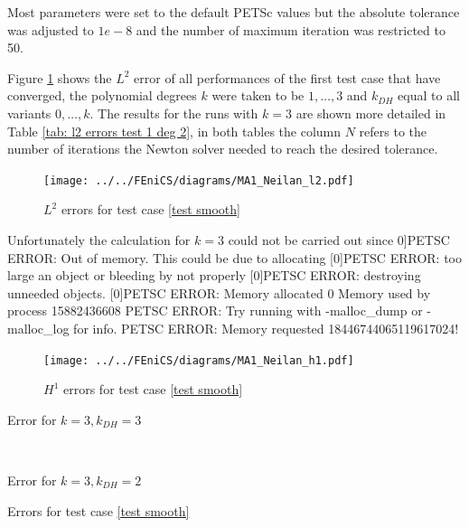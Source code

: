 Most parameters were set to the default PETSc values %
but the absolute tolerance was adjusted to $1e-8$ and the number of maximum iteration was restricted to 50. 

Figure \ref{fig: l2 errors test 1} shows the $L^2$ error of all performances of the first test case that have converged, the polynomial degrees $k$ were taken to be $1,\dots,3$ and $k_{DH}$ equal to all variants $0, \dots, k$.  The results for the runs with $k=3$ are shown more detailed in Table \ref{tab: l2 errors test 1 deg 2}, in both tables the column $N$ refers to the number of iterations the Newton solver needed to reach the desired tolerance. 



\begin{figure}[h!]
\centering
	\texttt{[image: ../../FEniCS/diagrams/MA1\_Neilan\_l2.pdf]}
	\caption{$L^2$ errors for test case \ref{test smooth}}
	\label{fig: l2 errors test 1}
\end{figure}
 Unfortunately the calculation for $k=3$ could not be carried out since 0]PETSC ERROR: Out of memory. This could be due to allocating
 [0]PETSC ERROR: too large an object or bleeding by not properly
 [0]PETSC ERROR: destroying unneeded objects.
 [0]PETSC ERROR: Memory allocated 0 Memory used by process 15882436608
 PETSC ERROR: Try running with -malloc\_dump or -malloc\_log for info.
 PETSC ERROR: Memory requested 18446744065119617024!
 
\begin{figure}[h!]
\centering
	\texttt{[image: ../../FEniCS/diagrams/MA1\_Neilan\_h1.pdf]}
	\caption{$H^1$ errors for test case \ref{test smooth}}
	\label{fig: h2 errors test 1}
\end{figure}

\begin{table}[h]
	\begin{subtable}[b]{0.45\textwidth}
		\centering
		\pgfplotstabletypeset[columns={iterations, l2error, h1error,N},
				    every row 0 column 0/.style={set content=init},
		]\MAOnedegThreeThree
    	\caption{Error for $k=3, k_{DH}=3$}
   \end{subtable}
   ~
	\begin{subtable}[b]{0.45\textwidth}
		\centering
		\pgfplotstabletypeset[columns={iterations, l2error, h1error,N},
				    every row 0 column 0/.style={set content=init},
		]\MAOnedegThreeTwo
 	\caption{Error for $k=3, k_{DH}=2$}
	\end{subtable}
	\caption{Errors for test case \ref{test smooth}}
	\label{tab: l2 errors test 1 deg 2}
\end{table}


